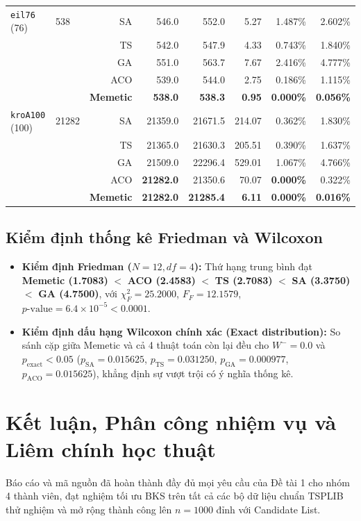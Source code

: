 \documentclass[12pt,a4paper]{report}
\begin{document}
\begin{table}[htbp]
\begin{tabular}{llrrrrrr}
\midrule
\texttt{eil76} (76) & 538 & SA & 546.0 & 552.0 & 5.27 & 1.487\% & 2.602\% \\
 & & TS & 542.0 & 547.9 & 4.33 & 0.743\% & 1.840\% \\
 & & GA & 551.0 & 563.7 & 7.67 & 2.416\% & 4.777\% \\
 & & ACO & 539.0 & 544.0 & 2.75 & 0.186\% & 1.115\% \\
 & & \textbf{Memetic} & \textbf{538.0} & \textbf{538.3} & \textbf{0.95} & \textbf{0.000\%} & \textbf{0.056\%} \\
\midrule
\texttt{kroA100} (100) & 21282 & SA & 21359.0 & 21671.5 & 214.07 & 0.362\% & 1.830\% \\
 & & TS & 21365.0 & 21630.3 & 205.51 & 0.390\% & 1.637\% \\
 & & GA & 21509.0 & 22296.4 & 529.01 & 1.067\% & 4.766\% \\
 & & ACO & \textbf{21282.0} & 21350.6 & 70.07 & \textbf{0.000\%} & 0.322\% \\
 & & \textbf{Memetic} & \textbf{21282.0} & \textbf{21285.4} & \textbf{6.11} & \textbf{0.000\%} & \textbf{0.016\%} \\
\bottomrule
\end{tabular}
\end{table}

\section{Kiểm định thống kê Friedman và Wilcoxon}
\begin{itemize}
    \item \textbf{Kiểm định Friedman ($N=12, df=4$):} Thứ hạng trung bình đạt \textbf{Memetic (1.7083)} $<$ \textbf{ACO (2.4583)} $<$ \textbf{TS (2.7083)} $<$ \textbf{SA (3.3750)} $<$ \textbf{GA (4.7500)}, với $\chi^2_F = 25.2000$, $F_F = 12.1579$, $p\text{-value} = 6.4 \times 10^{-5} < 0.0001$.
    \item \textbf{Kiểm định dấu hạng Wilcoxon chính xác (Exact distribution):} So sánh cặp giữa Memetic và cả 4 thuật toán còn lại đều cho $W^- = 0.0$ và $p_{\text{exact}} < 0.05$ ($p_{\text{SA}} = 0.015625$, $p_{\text{TS}} = 0.031250$, $p_{\text{GA}} = 0.000977$, $p_{\text{ACO}} = 0.015625$), khẳng định sự vượt trội có ý nghĩa thống kê.
\end{itemize}

\chapter{Kết luận, Phân công nhiệm vụ và Liêm chính học thuật}
Báo cáo và mã nguồn đã hoàn thành đầy đủ mọi yêu cầu của Đề tài 1 cho nhóm 4 thành viên, đạt nghiệm tối ưu BKS trên tất cả các bộ dữ liệu chuẩn TSPLIB thử nghiệm và mở rộng thành công lên $n=1000$ đỉnh với Candidate List.
\end{document}
